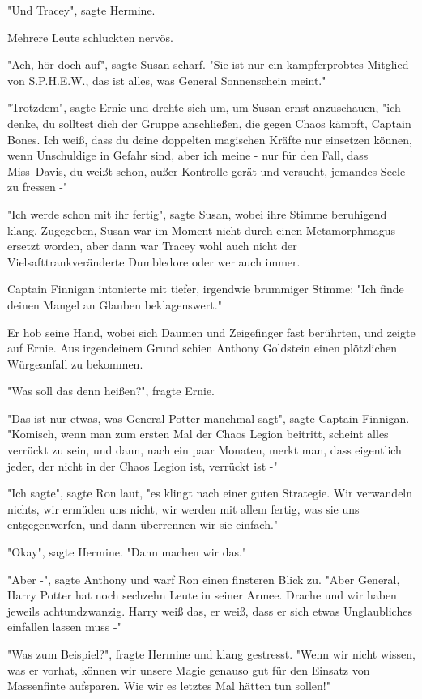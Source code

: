 {"Und Tracey", sagte Hermine.

Mehrere Leute schluckten nervös.

"Ach, hör doch auf", sagte Susan scharf. "Sie ist nur ein kampferprobtes Mitglied von S.P.H.E.W., das ist alles, was General Sonnenschein meint."

"Trotzdem", sagte Ernie und drehte sich um, um Susan ernst anzuschauen, "ich denke, du solltest dich der Gruppe anschließen, die gegen Chaos kämpft, Captain Bones. Ich weiß, dass du deine doppelten magischen Kräfte nur einsetzen können, wenn Unschuldige in Gefahr sind, aber ich meine - nur für den Fall, dass Miss~Davis, du weißt schon, außer Kontrolle gerät und versucht, jemandes Seele zu fressen -"

"Ich werde schon mit ihr fertig", sagte Susan, wobei ihre Stimme beruhigend klang. Zugegeben, Susan war im Moment nicht durch einen Metamorphmagus ersetzt worden, aber dann war Tracey wohl auch nicht der Vielsafttrankveränderte Dumbledore oder wer auch immer.

Captain Finnigan intonierte mit tiefer, irgendwie brummiger Stimme: "Ich finde deinen Mangel an Glauben beklagenswert."

Er hob seine Hand, wobei sich Daumen und Zeigefinger fast berührten, und zeigte auf Ernie. Aus irgendeinem Grund schien Anthony Goldstein einen plötzlichen Würgeanfall zu bekommen.

"Was soll das denn heißen?", fragte Ernie.

"Das ist nur etwas, was General Potter manchmal sagt", sagte Captain Finnigan. "Komisch, wenn man zum ersten Mal der Chaos Legion beitritt, scheint alles verrückt zu sein, und dann, nach ein paar Monaten, merkt man, dass eigentlich jeder, der nicht in der Chaos Legion ist, verrückt ist -"

"Ich sagte", sagte Ron laut, "es klingt nach einer guten Strategie. Wir verwandeln nichts, wir ermüden uns nicht, wir werden mit allem fertig, was sie uns entgegenwerfen, und dann überrennen wir sie einfach."

"Okay", sagte Hermine. "Dann machen wir das."

"Aber -", sagte Anthony und warf Ron einen finsteren Blick zu. "Aber General, Harry Potter hat noch sechzehn Leute in seiner Armee. Drache und wir haben jeweils achtundzwanzig. Harry weiß das, er weiß, dass er sich etwas Unglaubliches einfallen lassen muss -"

"Was zum Beispiel?", fragte Hermine und klang gestresst. "Wenn wir nicht wissen, was er vorhat, können wir unsere Magie genauso gut für den Einsatz von Massenfinte aufsparen. Wie wir es letztes Mal hätten tun sollen!"

}
